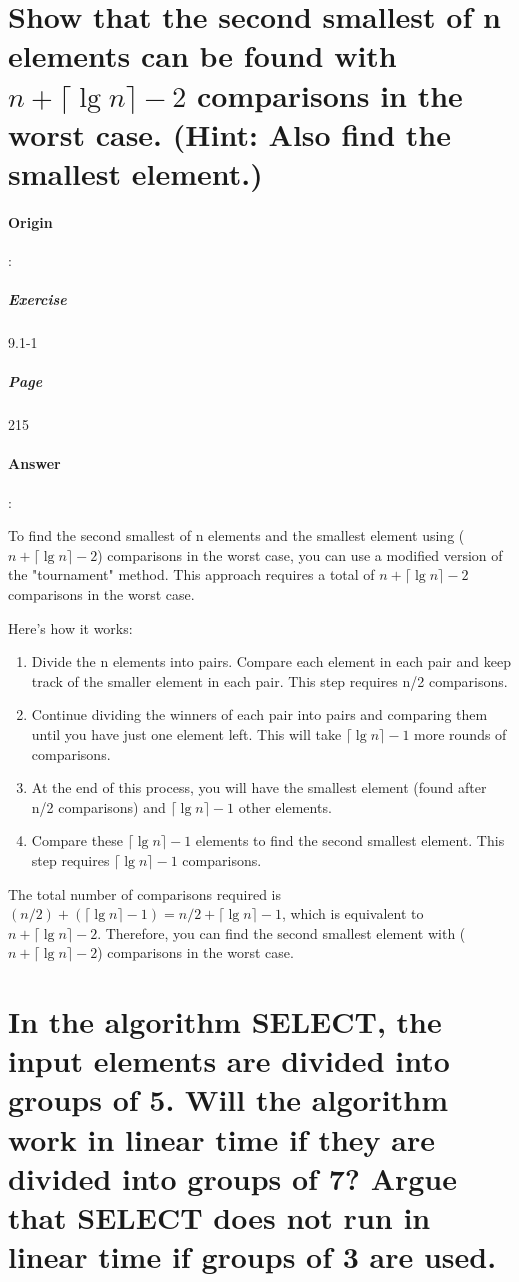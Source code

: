\documentclass{article}
\begin{document}
\section{Show that the second smallest of n elements can be found with $n+\lceil \lg n\rceil -2$ comparisons in the worst case. (Hint: Also find the smallest element.)}
\paragraph{Origin}:
  \subparagraph{Exercise}9.1-1
  \subparagraph{Page}215
\paragraph{Answer}:


To find the second smallest of n elements and the smallest element using ($n + \lceil \lg n \rceil - 2$) comparisons in the worst case, you can use a modified version of the "tournament" method. This approach requires a total of $n + \lceil \lg n \rceil - 2$ comparisons in the worst case.

Here's how it works:

\begin{enumerate}
  \item Divide the n elements into pairs. Compare each element in each pair and keep track of the smaller element in each pair. This step requires n/2 comparisons.
  \item Continue dividing the winners of each pair into pairs and comparing them until you have just one element left. This will take $\lceil \lg n \rceil - 1$ more rounds of comparisons.
  \item At the end of this process, you will have the smallest element (found after n/2 comparisons) and $\lceil \lg n\rceil - 1$ other elements.
  \item Compare these $\lceil \lg n\rceil - 1$ elements to find the second smallest element. This step requires $\lceil \lg n\rceil - 1$ comparisons.

\end{enumerate}

The total number of comparisons required is $(n/2) + (\lceil \lg n \rceil - 1) = n/2 + \lceil \lg n \rceil - 1$, which is equivalent to $n + \lceil \lg n \rceil - 2$. Therefore, you can find the second smallest element with ($n + \lceil \lg n \rceil - 2$) comparisons in the worst case.

\section{In the algorithm SELECT, the input elements are divided into groups of 5. Will the algorithm work in linear time if they are divided into groups of 7? Argue that SELECT does not run in linear time if groups of 3 are used.}
\end{document}
